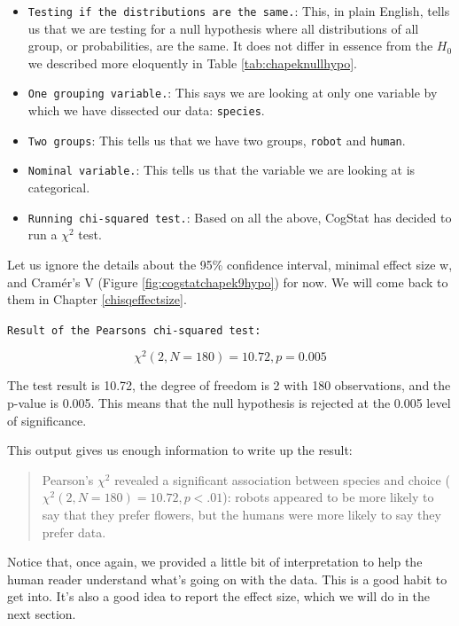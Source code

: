\documentclass[
]{book}
\providecommand{\tightlist}{%
  \setlength{\itemsep}{0pt}\setlength{\parskip}{0pt}}
\theoremstyle{definition}
\theoremstyle{definition}
\theoremstyle{definition}
\theoremstyle{definition}
\theoremstyle{remark}
\begin{document}
\begin{itemize}
\tightlist
\item
  \texttt{Testing\ if\ the\ distributions\ are\ the\ same.}: This, in plain English, tells us that we are testing for a null hypothesis where all distributions of all group, or probabilities, are the same. It does not differ in essence from the \(H_0\) we described more eloquently in Table \ref{tab:chapeknullhypo}.
\item
  \texttt{One\ grouping\ variable.}: This says we are looking at only one variable by which we have dissected our data: \texttt{species}.
\item
  \texttt{Two\ groups}: This tells us that we have two groups, \texttt{robot} and \texttt{human}.
\item
  \texttt{Nominal\ variable.}: This tells us that the variable we are looking at is categorical.
\item
  \texttt{Running\ chi-squared\ test.}: Based on all the above, CogStat has decided to run a \(\chi^2\) test.
\end{itemize}

Let us ignore the details about the 95\% confidence interval, minimal effect size w, and Cramér's V (Figure \ref{fig:cogstatchapek9hypo}) for now. We will come back to them in Chapter \ref{chisqeffectsize}.

\texttt{Result\ of\ the\ Pearson\textquotesingle{}s\ chi-squared\ test:}

\[
\chi^2(2, N = 180) = 10.72, p = 0.005
\]

The test result is 10.72, the degree of freedom is 2 with 180 observations, and the p-value is 0.005. This means that the null hypothesis is rejected at the 0.005 level of significance.

This output gives us enough information to write up the result:

\begin{quote}
Pearson's \(\chi^2\) revealed a significant association between species and choice (\(\chi^2(2, N = 180) = 10.72, p < .01\)): robots appeared to be more likely to say that they prefer flowers, but the humans were more likely to say they prefer data.
\end{quote}

Notice that, once again, we provided a little bit of interpretation to help the human reader understand what's going on with the data. This is a good habit to get into. It's also a good idea to report the effect size, which we will do in the next section.
\end{document}
